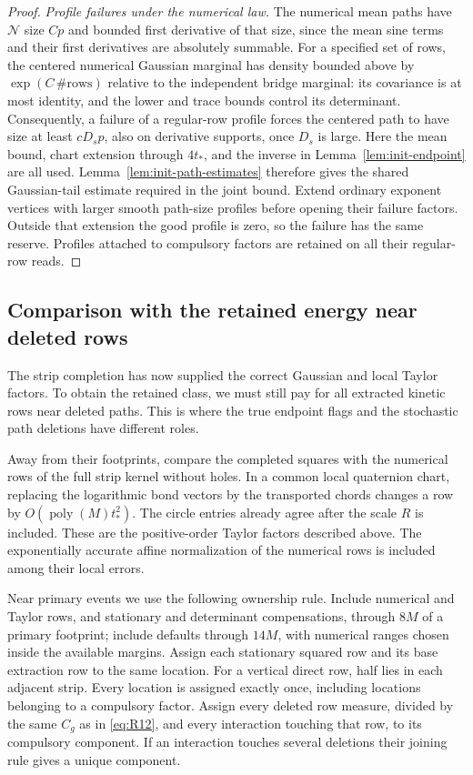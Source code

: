 \begin{proof}
\emph{Profile failures under the numerical law.}
The numerical mean paths have
$\mathcal N$ size $Cp$ and bounded first derivative of that size, since
the mean sine terms and their first derivatives are absolutely summable.
For a specified set of rows, the centered numerical Gaussian marginal
has density bounded above by $\exp(C\,\#\text{rows})$ relative to the
independent bridge marginal: its covariance is at most identity, and
the lower and trace bounds control its determinant.  Consequently,
a failure of a regular-row profile forces the centered path to have
size at least $cD_sp$, also on derivative supports, once $D_s$ is large.
Here the mean bound, chart extension through $4t_*$, and the inverse
in Lemma~\ref{lem:init-endpoint} are all used.  Lemma~\ref{lem:init-path-estimates}
therefore gives the shared Gaussian-tail estimate required in the
joint bound.  Extend ordinary exponent vertices with larger smooth
path-size profiles before opening their failure factors.  Outside
that extension the good profile is zero, so the failure has the same
reserve.  Profiles attached to compulsory factors are retained on all
their regular-row reads.
\end{proof}

\subsection{Comparison with the retained energy near deleted rows}

The strip completion has now supplied the correct Gaussian and local
Taylor factors.  To obtain the retained class, we must still pay for
all extracted kinetic rows near deleted paths.  This is where the true
endpoint flags and the stochastic path deletions have different roles.

Away from their footprints, compare the completed squares with the
numerical rows of the full strip kernel without holes.  In a common
local quaternion chart, replacing the logarithmic bond vectors by the
transported chords changes a row by
$O(\operatorname{poly}(M)t_*^2)$.  The circle entries already agree
after the scale $R$ is included.  These are the positive-order Taylor
factors described above.  The exponentially accurate affine
normalization of the numerical rows is included among their local
errors.

Near primary events we use the following ownership rule.  Include
numerical and Taylor rows, and stationary and determinant compensations,
through $8M$ of a primary footprint; include defaults through $14M$,
with numerical ranges chosen inside the available margins.  Assign each
stationary squared row and its base extraction row to the same location.
For a vertical direct row, half lies in each adjacent strip.  Every
location is assigned exactly once, including locations belonging to a
compulsory factor.  Assign every deleted row measure, divided by the
same $C_g$ as in \eqref{eq:R12}, and every interaction touching that
row, to its compulsory component.  If an interaction touches several
deletions their joining rule gives a unique component.

